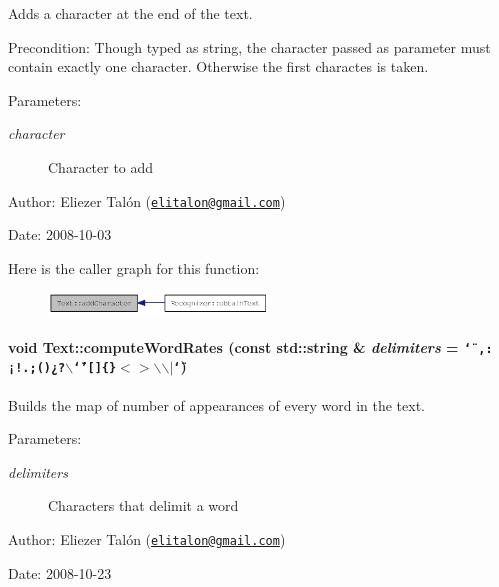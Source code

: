 Adds a character at the end of the text. 

\begin{Desc}
\item[Precondition:]Though typed as string, the character passed as parameter must contain exactly one character. Otherwise the first charactes is taken.\end{Desc}
\begin{Desc}
\item[Parameters:]
\begin{description}
\item[{\em character}]Character to add\end{description}
\end{Desc}
\begin{Desc}
\item[Author:]Eliezer Talón (\href{mailto:elitalon@gmail.com}{\tt elitalon@gmail.com}) \end{Desc}
\begin{Desc}
\item[Date:]2008-10-03 \end{Desc}


Here is the caller graph for this function:\nopagebreak
\begin{figure}[H]
\begin{center}
\leavevmode
\includegraphics[width=166pt]{class_text_d2c0cb733cef33657a44e4efc9e518ee_icgraph}
\end{center}
\end{figure}
\hypertarget{class_text_efd7305b29212ad1db1a51bb1081b770}{
\paragraph[{computeWordRates}]{\setlength{\rightskip}{0pt plus 5cm}void Text::computeWordRates (const std::string \& {\em delimiters} = {\tt \char`\"{}~,:¡!.;()¿?$\backslash$\char`\"{}'\mbox{[}\mbox{]}\{\}$<$$>$$\backslash$$\backslash$$|$\char`\"{}})}\hfill}
\label{class_text_efd7305b29212ad1db1a51bb1081b770}


Builds the map of number of appearances of every word in the text. 

\begin{Desc}
\item[Parameters:]
\begin{description}
\item[{\em delimiters}]Characters that delimit a word\end{description}
\end{Desc}
\begin{Desc}
\item[Author:]Eliezer Talón (\href{mailto:elitalon@gmail.com}{\tt elitalon@gmail.com}) \end{Desc}
\begin{Desc}
\item[Date:]2008-10-23 \end{Desc}


